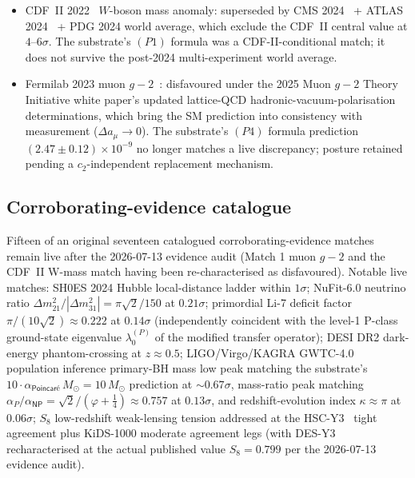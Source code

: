 \documentclass[11pt,a4paper]{amsart}
\theoremstyle{plain}
\theoremstyle{definition}
\begin{document}
\begin{itemize}[itemsep=1pt,leftmargin=1.5em]
\item CDF~II 2022~\cite{cdf2022wboson} $W$-boson mass anomaly: superseded by CMS 2024~\cite{cms-wmass-2024} + ATLAS 2024~\cite{atlas-wmass-2024} + PDG 2024 world average, which exclude the CDF~II central value at $4$--$6\sigma$. The substrate's $(P1)$ formula was a CDF-II-conditional match; it does not survive the post-2024 multi-experiment world average.
\item Fermilab 2023 muon $g - 2$~\cite{fermilab-muon-g-2}: disfavoured under the 2025 Muon $g-2$ Theory Initiative white paper's updated lattice-QCD hadronic-vacuum-polarisation determinations, which bring the SM prediction into consistency with measurement ($\Delta a_{\mu} \to 0$). The substrate's $(P4)$ formula prediction $(2.47 \pm 0.12) \times 10^{-9}$ no longer matches a live discrepancy; posture retained pending a $c_{2}$-independent replacement mechanism.
\end{itemize}

\subsection{Corroborating-evidence catalogue}

Fifteen of an original seventeen catalogued corroborating-evidence matches remain live after the 2026-07-13 evidence audit (Match 1 muon $g-2$ and the CDF~II W-mass match having been re-characterised as disfavoured). Notable live matches: SH0ES 2024 Hubble local-distance ladder within $1\sigma$; NuFit-6.0 neutrino ratio $\Delta m_{21}^{2}/|\Delta m_{31}^{2}| = \pi\sqrt{2}/150$ at $0.21\sigma$; primordial Li-7 deficit factor $\pi/(10\sqrt{2}) \approx 0.222$ at $0.14\sigma$ (independently coincident with the level-1 P-class ground-state eigenvalue $\lambda_{0}^{(P)}$ of the modified transfer operator); DESI DR2 dark-energy phantom-crossing at $z \approx 0.5$; LIGO/Virgo/KAGRA GWTC-4.0~\cite{ligo-gwtc4-pop} population inference primary-BH mass low peak matching the substrate's $10 \cdot \alpha_{\textsf{Poincar\'e}} \, M_{\odot} = 10 \, M_{\odot}$ prediction at $\sim 0.67\sigma$, mass-ratio peak matching $\alpha_{P}/\alpha_{\textsf{NP}} = \sqrt{2}/(\varphi + \tfrac{1}{4}) \approx 0.757$ at $0.13\sigma$, and redshift-evolution index $\kappa \approx \pi$ at $0.06\sigma$; $S_{8}$ low-redshift weak-lensing tension addressed at the HSC-Y3~\cite{kids-1000-s8} tight agreement plus KiDS-1000 moderate agreement legs (with DES-Y3~\cite{des-y3-s8} recharacterised at the actual published value $S_{8} = 0.799$ per the 2026-07-13 evidence audit).
\end{document}
